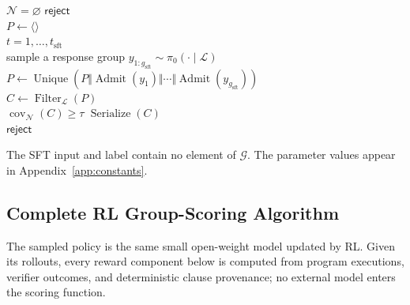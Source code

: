 \begin{algorithm}[H]
\caption{Multi-response SFT synthesis}
\label{alg:formal-sft}
\begin{algorithmic}
\algline {} \(\mathcal N=\varnothing\)  \(\mathsf{reject}\)\\
\algline \(P\leftarrow\langle\rangle\)\\
\algline {} \(t=1,\ldots,t_{\mathrm{sft}}\) \\
\algline \algind sample a response group \(y_{1:g_{\mathrm{sft}}}\sim\pi_0(\cdot\mid\mathcal L)\)\\
\algline \algind \(P\leftarrow\operatorname{Unique}(P\Vert
  \operatorname{Admit}(y_1)\Vert\cdots\Vert
  \operatorname{Admit}(y_{g_{\mathrm{sft}}}))\)\\
\algline \algind \(C\leftarrow\operatorname{Filter}_{\mathcal L}(P)\)\\
\algline \algind {} \(\operatorname{cov}_{\mathcal N}(C)\ge\tau\)
   \(\operatorname{Serialize}(C)\)\\
\algline {} \(\mathsf{reject}\)\\
\end{algorithmic}
\end{algorithm}

The SFT input and label contain no element of \(\mathcal G\).  The parameter
values appear in Appendix~\ref{app:constants}.

\subsection{Complete RL Group-Scoring Algorithm}

The sampled policy is the same small open-weight model updated by RL.  Given
its rollouts, every reward component below is computed from program
executions, verifier outcomes, and deterministic clause provenance; no
external model enters the scoring function.

